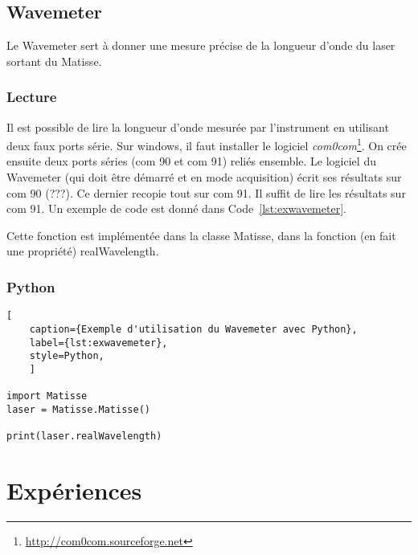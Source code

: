 \documentclass[11pt,francais]{book} %
\begin{document}

\section{Wavemeter}\label{wavemeter}

Le Wavemeter sert à donner une mesure précise de la longueur d'onde du laser sortant du Matisse.

\subsection{Lecture}
Il est possible de lire la longueur d'onde mesurée par l'instrument en utilisant deux faux ports série.
Sur windows, il faut installer le logiciel {\it com0com}\footnote{\url{http://com0com.sourceforge.net}}.
On crée ensuite deux ports séries (com 90 et com 91) reliés ensemble.
Le logiciel du Wavemeter (qui doit être démarré et en mode acquisition) écrit ses résultats sur com 90 (???).
Ce dernier recopie tout sur com 91.
Il suffit de lire les résultats sur com 91.
Un exemple de code est donné dans Code~\ref{lst:exwavemeter}.

Cette fonction est implémentée dans la classe Matisse, dans la fonction (en fait une propriété) realWavelength.

\subsection{Python}

\begin{lstlisting}[
    caption={Exemple d'utilisation du Wavemeter avec Python},
    label={lst:exwavemeter},
    style=Python,
    ]  

import Matisse
laser = Matisse.Matisse()

print(laser.realWavelength)
\end{lstlisting}




\chapter{Expériences}
\end{document}
